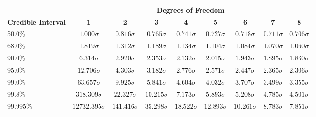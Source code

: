 \begin{center}
\begin{tabular}{p{0.75in}cccccccc}
 & \multicolumn{8}{c}{\bf Degrees of Freedom} \\
{\bf Credible Interval} & {\bf 1} & {\bf 2} & {\bf 3} & {\bf 4} & {\bf 5} & {\bf 6} & {\bf 7} & {\bf 8}\\
50.0\%& $ 1.000 \sigma$& $ 0.816 \sigma$& $ 0.765 \sigma$& $ 0.741 \sigma$& $ 0.727 \sigma$& $ 0.718 \sigma$& $ 0.711 \sigma$& $ 0.706 \sigma$\\
68.0\%& $ 1.819 \sigma$& $ 1.312 \sigma$& $ 1.189 \sigma$& $ 1.134 \sigma$& $ 1.104 \sigma$& $ 1.084 \sigma$& $ 1.070 \sigma$& $ 1.060 \sigma$\\
90.0\%& $ 6.314 \sigma$& $ 2.920 \sigma$& $ 2.353 \sigma$& $ 2.132 \sigma$& $ 2.015 \sigma$& $ 1.943 \sigma$& $ 1.895 \sigma$& $ 1.860 \sigma$\\
95.0\%& $ 12.706 \sigma$& $ 4.303 \sigma$& $ 3.182 \sigma$& $ 2.776 \sigma$& $ 2.571 \sigma$& $ 2.447 \sigma$& $ 2.365 \sigma$& $ 2.306 \sigma$\\
99.0\%& $ 63.657 \sigma$& $ 9.925 \sigma$& $ 5.841 \sigma$& $ 4.604 \sigma$& $ 4.032 \sigma$& $ 3.707 \sigma$& $ 3.499 \sigma$& $ 3.355 \sigma$\\
99.8\%& $ 318.309 \sigma$& $ 22.327 \sigma$& $ 10.215 \sigma$& $ 7.173 \sigma$& $ 5.893 \sigma$& $ 5.208 \sigma$& $ 4.785 \sigma$& $ 4.501 \sigma$\\
99.995\%& $ 12732.395 \sigma$& $ 141.416 \sigma$& $ 35.298 \sigma$& $ 18.522 \sigma$& $ 12.893 \sigma$& $ 10.261 \sigma$& $ 8.783 \sigma$& $ 7.851 \sigma$\\
\end{tabular}
\end{center}

